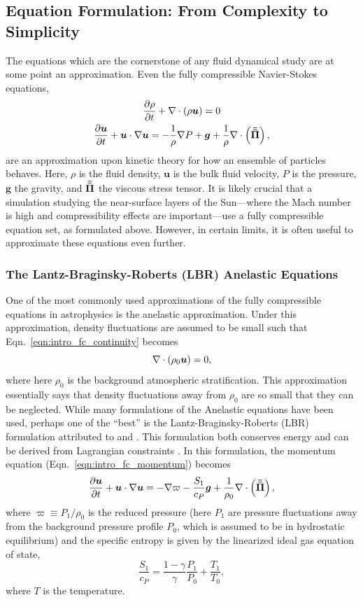 \subsection{Equation Formulation: From Complexity to Simplicity}
\label{sct:intro_equations}
The equations which are the cornerstone of any fluid dynamical study are at some point an approximation.
Even the fully compressible Navier-Stokes equations,
\begin{gather}
\frac{\partial \rho}{\partial t} + \nabla\cdot\left( \rho\bm{u}\right) = 0 
\label{eqn:intro_fc_continuity}
\\
\frac{\partial \bm{u}}{\partial t} + \bm{u}\cdot\nabla\bm{u} = -\frac{1}{\rho}\nabla P + \bm{g} + \frac{1}{\rho}\nabla\cdot\left( \bm{\bar{\bar{\Pi}}}\right),
\label{eqn:intro_fc_momentum}
\end{gather}
are an approximation upon kinetic theory for how an ensemble of particles behaves.
Here, $\rho$ is the fluid density, $\bm{u}$ is the bulk fluid velocity, $P$ is the pressure, $\bm{g}$ the gravity, and $\bm{\bar{\bar{\Pi}}}$ the viscous stress tensor.
It is likely crucial that a simulation studying the near-surface layers of the Sun---where the Mach number is high and compressibility effects are important---use a fully compressible equation set, as formulated above.
However, in certain limits, it is often useful to approximate these equations even further.

\subsubsection{The Lantz-Braginsky-Roberts (LBR) Anelastic Equations}
One of the most commonly used approximations of the fully compressible equations in astrophysics is the anelastic approximation.
Under this approximation, density fluctuations are assumed to be small such that Eqn.~\ref{eqn:intro_fc_continuity} becomes
\begin{equation}
\nabla\cdot\left( \rho_0 \bm{u}\right) = 0,
\label{eqn:intro_an_continuity}
\end{equation}
where here $\rho_0$ is the background atmospheric stratification.
This approximation essentially says that density fluctuations away from $\rho_0$ are so small that they can be neglected.
While many formulations of the Anelastic equations have been used, perhaps one of the ``best'' is the Lantz-Braginsky-Roberts (LBR) formulation attributed to \citet{lantz1992} and \citet{braginsky&roberts1995}.
This formulation both conserves energy \citep{brown&all2012} and can be derived from Lagrangian constraints \citep{vasil&all2013}.
In this formulation, the momentum equation (Eqn.~\ref{eqn:intro_fc_momentum}) becomes
\begin{equation}
\frac{\partial \bm{u}}{\partial t} + \bm{u}\cdot\nabla\bm{u} = -\nabla \varpi - \frac{S_1}{c_P} \bm{g} + \frac{1}{\rho_0}\nabla\cdot\left( \bm{\bar{\bar{\Pi}}}\right),
\label{eqn:intro_an_momentum}
\end{equation}
where $\varpi \equiv P_1 / \rho_0$ is the reduced pressure (here $P_1$ are pressure fluctuations away from the background pressure profile $P_0$, which is assumed to be in hydrostatic equilibrium) and the specific entropy is given by the linearized ideal gas equation of state,
$$
\frac{S_1}{c_P} = \frac{1-\gamma}{\gamma}\frac{P_1}{P_0} + \frac{T_1}{T_0},
$$
where $T$ is the temperature.

